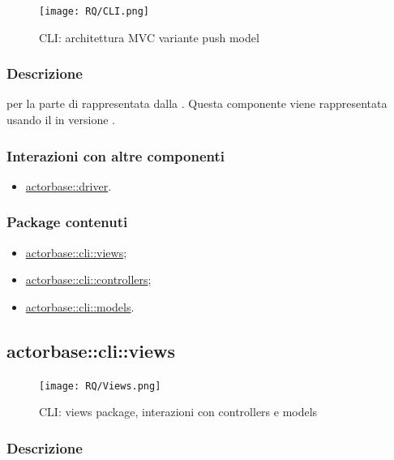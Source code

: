 \documentclass{scalatekids-article}
\begin{document}
\begin{figure}[H]
  \begin{center}
    \texttt{[image: RQ/CLI.png]}
    \caption{CLI: architettura MVC variante push model}
  \end{center}
\end{figure}

\subsubsection{Descrizione}
 per la parte di  rappresentata dalla .
Questa componente viene rappresentata usando il 
 in versione .

\subsubsection{Interazioni con altre componenti}
\begin{itemize}
\item \hyperref[sec:actorbase::driver]{actorbase::driver}.
\end{itemize}

\subsubsection{Package contenuti}
\begin{itemize}
\item \hyperref[sec:actorbase::cli::views]{actorbase::cli::views};
\item \hyperref[sec:actorbase::cli::controllers]{actorbase::cli::controllers};
\item \hyperref[sec:actorbase::cli::models]{actorbase::cli::models}.
\end{itemize}

\subsection{actorbase::cli::views}
\label{sec:actorbase::cli::views}

\begin{figure}[H]
  \begin{center}
    \texttt{[image: RQ/Views.png]}
    \caption{CLI: views package, interazioni con controllers e models}
  \end{center}
\end{figure}

\subsubsection{Descrizione}
\end{document}

